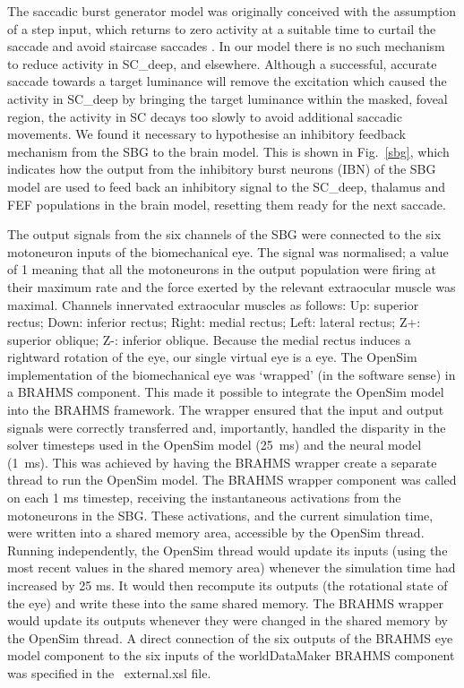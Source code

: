\documentclass{frontiersSCNS}
\begin{document}
The saccadic burst generator model was originally conceived with the
assumption of a step input, which returns to zero activity at a
suitable time to curtail the saccade and avoid staircase
saccades \citep{gancarz_neural_1998}. In our model there is no such
mechanism to reduce activity in SC\_deep, and elsewhere.  Although a
successful, accurate saccade towards a target luminance will remove
the excitation which caused the activity in SC\_deep by bringing the
target luminance within the masked, foveal region, the activity in SC
decays too slowly to avoid additional saccadic movements. We found it
necessary to hypothesise an inhibitory feedback mechanism from the SBG
to the brain model.  This is shown in Fig.~\ref{sbg}, which indicates
how the output from the inhibitory burst neurons (IBN) of the SBG
model are used to feed back an inhibitory signal to the SC\_deep,
thalamus and FEF populations in the brain model, resetting them ready
for the next saccade.

The output signals from the six channels of the SBG were connected to
the six motoneuron inputs of the biomechanical eye. The signal was
normalised; a value of 1 meaning that all the motoneurons in the
output population were firing at their maximum rate and the force
exerted by the relevant extraocular muscle was maximal. Channels
innervated extraocular muscles as follows: Up: superior rectus; Down:
inferior rectus; Right: medial rectus; Left: lateral rectus; Z+:
superior oblique; Z-: inferior oblique. Because the medial rectus
induces a rightward rotation of the eye, our single virtual eye is
a  eye. The OpenSim implementation of the biomechanical eye
was `wrapped' (in the software sense) in a BRAHMS component. This made
it possible to integrate the OpenSim model into the BRAHMS
framework. The wrapper ensured that the input and output signals were
correctly transferred and, importantly, handled the disparity in the
solver timesteps used in the OpenSim model (25~ms) and the neural
model (1~ms). This was achieved by having the BRAHMS wrapper create a
separate thread to run the OpenSim model. The BRAHMS wrapper component
was called on each 1 ms timestep, receiving the instantaneous
activations from the motoneurons in the SBG. These activations, and
the current simulation time, were written into a shared memory area,
accessible by the OpenSim thread. Running independently, the OpenSim
thread would update its inputs (using the most recent values in the
shared memory area) whenever the simulation time had increased by 25
ms. It would then recompute its outputs (the rotational state of the
eye) and write these into the same shared memory. The BRAHMS wrapper
would update its outputs whenever they were changed in the shared
memory by the OpenSim thread. A direct connection of the six outputs
of the BRAHMS eye model component to the six inputs of the
worldDataMaker BRAHMS component was specified in
the \stob~external.xsl file.
\end{document}
